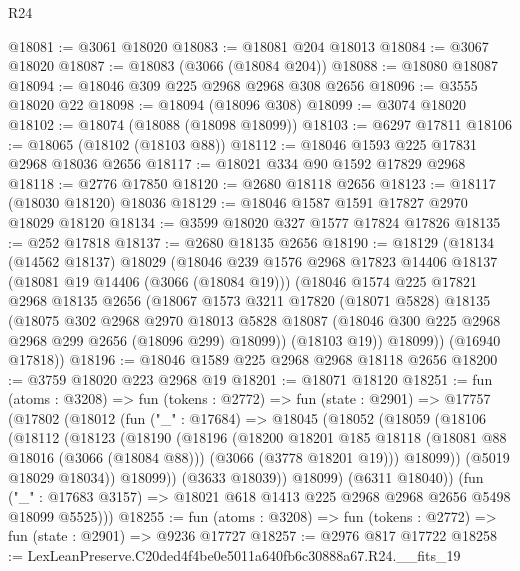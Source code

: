 \begin{lexlean}{R24}
\begin{coremodule}
@18081 := @3061 @18020
@18083 := @18081 @204 @18013
@18084 := @3067 @18020
@18087 := @18083 (@3066 (@18084 @204))
@18088 := @18080 @18087
@18094 := @18046 @309 @225 @2968 @2968 @308 @2656
@18096 := @3555 @18020 @22
@18098 := @18094 (@18096 @308)
@18099 := @3074 @18020
@18102 := @18074 (@18088 (@18098 @18099))
@18103 := @6297 @17811
@18106 := @18065 (@18102 (@18103 @88))
@18112 := @18046 @1593 @225 @17831 @2968 @18036 @2656
@18117 := @18021 @334 @90 @1592 @17829 @2968
@18118 := @2776 @17850
@18120 := @2680 @18118 @2656
@18123 := @18117 (@18030 @18120) @18036
@18129 := @18046 @1587 @1591 @17827 @2970 @18029 @18120
@18134 := @3599 @18020 @327 @1577 @17824 @17826
@18135 := @252 @17818
@18137 := @2680 @18135 @2656
@18190 := @18129
    (@18134
      (@14562 @18137)
      @18029
      (@18046
        @239
        @1576
        @2968
        @17823
        @14406
        @18137
        (@18081 @19 @14406 (@3066 (@18084 @19)))
        (@18046
          @1574
          @225
          @17821
          @2968
          @18135
          @2656
          (@18067
            @1573
            @3211
            @17820
            (@18071 @5828)
            @18135
            (@18075
              @302
              @2968
              @2970
              @18013
              @5828
              @18087
              (@18046 @300 @225 @2968 @2968 @299 @2656 (@18096 @299) @18099))
            (@18103 @19))
          @18099))
      (@16940 @17818))
@18196 := @18046 @1589 @225 @2968 @2968 @18118 @2656
@18200 := @3759 @18020 @223 @2968 @19
@18201 := @18071 @18120
@18251 := fun (atoms : @3208) =>
  fun (tokens : @2772) =>
  fun (state : @2901) =>
  @17757
    (@17802
      (@18012
        (fun ("_" : @17684) =>
        @18045
          (@18052
            (@18059
              (@18106
                (@18112
                  (@18123
                    (@18190
                      (@18196
                        (@18200
                          @18201
                          @185
                          @18118
                          (@18081 @88 @18016 (@3066 (@18084 @88)))
                          (@3066 (@3778 @18201 @19)))
                        @18099))
                    (@5019 @18029 @18034))
                  @18099))
              (@3633 @18039))
            @18099)
          (@6311 @18040))
        (fun ("_" : @17683 @3157) => @18021 @618 @1413 @225 @2968 @2968 @2656 @5498 @18099 @5525)))
@18255 := fun (atoms : @3208) => fun (tokens : @2772) => fun (state : @2901) => @9236 @17727
@18257 := @2976 @817 @17722
@18258 := LexLeanPreserve.C20ded4f4be0e5011a640fb6c30888a67.R24.__fits_19

\end{coremodule}
\end{lexlean}
